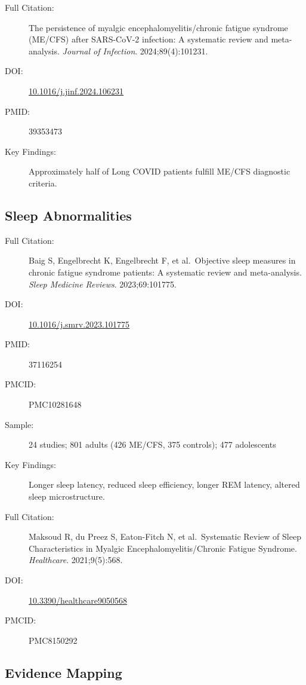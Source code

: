 \begin{description}
    \item[Full Citation:] The persistence of myalgic encephalomyelitis/chronic fatigue syndrome (ME/CFS) after SARS-CoV-2 infection: A systematic review and meta-analysis. \textit{Journal of Infection}. 2024;89(4):101231.
    \item[DOI:] \href{https://doi.org/10.1016/j.jinf.2024.106231}{10.1016/j.jinf.2024.106231}
    \item[PMID:] 39353473
    \item[Key Findings:] Approximately half of Long COVID patients fulfill ME/CFS diagnostic criteria.
\end{description}

\subsection{Sleep Abnormalities}

\begin{description}
    \item[Full Citation:] Baig S, Engelbrecht K, Engelbrecht F, et al.\ Objective sleep measures in chronic fatigue syndrome patients: A systematic review and meta-analysis. \textit{Sleep Medicine Reviews}. 2023;69:101775.
    \item[DOI:] \href{https://doi.org/10.1016/j.smrv.2023.101775}{10.1016/j.smrv.2023.101775}
    \item[PMID:] 37116254
    \item[PMCID:] PMC10281648
    \item[Sample:] 24 studies; 801 adults (426 ME/CFS, 375 controls); 477 adolescents
    \item[Key Findings:] Longer sleep latency, reduced sleep efficiency, longer REM latency, altered sleep microstructure.
\end{description}

\begin{description}
    \item[Full Citation:] Maksoud R, du Preez S, Eaton-Fitch N, et al.\ Systematic Review of Sleep Characteristics in Myalgic Encephalomyelitis/Chronic Fatigue Syndrome. \textit{Healthcare}. 2021;9(5):568.
    \item[DOI:] \href{https://doi.org/10.3390/healthcare9050568}{10.3390/healthcare9050568}
    \item[PMCID:] PMC8150292
\end{description}

\subsection{Evidence Mapping}

